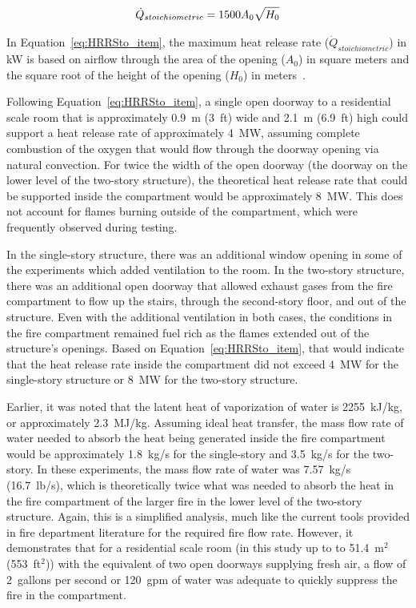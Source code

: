 \documentclass[12pt,oneside]{book}
\begin{document}
\begin{equation} \label{eq:HRRSto_item}
\dot{Q}_{stoichiometric} = 1500 A_0 \sqrt{H_0} \\
\end{equation}

In Equation~\ref{eq:HRRSto_item}, the maximum heat release rate ($\dot{Q}_{stoichiometric}$) in kW is based on airflow through the area of the opening ($A_0$) in square meters and the square root of the height of the opening ($H_0$) in meters~\cite{Babrauskas:4}.  

Following Equation~\ref{eq:HRRSto_item}, a single open doorway to a residential scale room that is approximately 0.9~m (3~ft) wide and 2.1~m (6.9~ft) high could support a heat release rate of approximately 4~MW, assuming complete combustion of the oxygen that would flow through the doorway opening via natural convection. For twice the width of the open doorway (the doorway on the lower level of the two-story structure), the theoretical heat release rate that could be supported inside the compartment would be approximately 8~MW. This does not account for flames burning outside of the compartment, which were frequently observed during testing.  

In the single-story structure, there was an additional window opening in some of the experiments which added ventilation to the room. In the two-story structure, there was an additional open doorway that allowed exhaust gases from the fire compartment to flow up the stairs, through the second-story floor, and out of the structure. Even with the additional ventilation in both cases, the conditions in the fire compartment remained fuel rich as the flames extended out of the structure's openings. Based on Equation~\ref{eq:HRRSto_item}, that would indicate that the heat release rate inside the compartment did not exceed 4~MW for the single-story structure or 8~MW for the two-story structure. 

Earlier, it was noted that the latent heat of vaporization of water is 2255~kJ/kg, or approximately 2.3~MJ/kg. Assuming ideal heat transfer, the mass flow rate of water needed to absorb the heat being generated inside the fire compartment would be approximately 1.8~kg/s for the single-story and 3.5~kg/s for the two-story. In these experiments, the mass flow rate of water was 7.57~kg/s (16.7~lb/s), which is theoretically twice what was needed to absorb the heat in the fire compartment of the larger fire in the lower level of the two-story structure. Again, this is a simplified analysis, much like the current tools provided in fire department literature for the required fire flow rate. However, it demonstrates that for a residential scale room (in this study up to to 51.4~m$^2$ (553~ft$^2$)) with the equivalent of two open doorways supplying fresh air, a flow of 2~gallons per second or 120~gpm of water was adequate to quickly suppress the fire in the compartment.                
\end{document}
